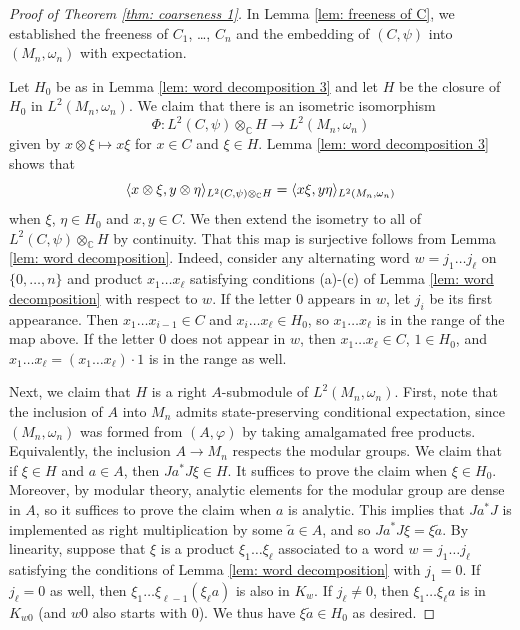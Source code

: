 \documentclass[10pt]{amsart}
\numberwithin{equation}{section}
\theoremstyle{definition}
\newcommand{\C}{\mathbb{C}}
\DeclarePairedDelimiter{\ip}{\langle}{\rangle}
\begin{document}
\begin{proof}[Proof of Theorem \ref{thm: coarseness 1}]
In Lemma \ref{lem: freeness of C}, we established the freeness of $C_1$, \dots, $C_n$ and the embedding of $(C,\psi)$ into $(M_n,\omega_n)$ with expectation.

Let $H_0$ be as in Lemma \ref{lem: word decomposition 3} and let $H$ be the closure of $H_0$ in $L^2(M_n,\omega_n)$.  We claim that there is an isometric isomorphism
\begin{equation} \label{eq: constructing isometry}
	\Phi: L^2(C,\psi) \otimes_{\C} H \to L^2(M_n,\omega_n)
\end{equation}
given by $x \otimes \xi \mapsto x \xi$ for $x \in C$ and $\xi \in H$.  Lemma \ref{lem: word decomposition 3} shows that
\[
\ip{x \otimes \xi, y \otimes \eta}_{L^2(C,\psi) \otimes_{\C} H} = \ip{x\xi, y \eta}_{L^2(M_n,\omega_n)}
\]
when $\xi$, $\eta \in H_0$ and $x, y \in C$.  We then extend the isometry to all of $L^2(C,\psi) \otimes_{\C} H$ by continuity. That this map is surjective follows from Lemma \ref{lem: word decomposition}. Indeed, consider any alternating word $w = j_1\dots j_\ell$ on $\{0,\dots,n\}$ and product $x_1\dots x_\ell$ satisfying conditions (a)-(c) of Lemma \ref{lem: word decomposition} with respect to $w$. If the letter 0 appears in $w$, let $j_i$ be its first appearance. Then $x_1\dots x_{i-1} \in C$ and $x_i\dots x_\ell \in H_0$, so $x_1\dots x_\ell$ is in the range of the map above. If the letter 0 does not appear in $w$, then $x_1\dots x_\ell \in C$, $1 \in H_0$, and $x_1\dots x_\ell = (x_1\dots x_\ell) \cdot 1$ is in the range as well.

Next, we claim that $H$ is a right $A$-submodule of $L^2(M_n,\omega_n)$.  First, note that the inclusion of $A$ into $M_n$ admits state-preserving conditional expectation, since $(M_n,\omega_n)$ was formed from $(A,\varphi)$ by taking amalgamated free products.  Equivalently, the inclusion $A \to M_n$ respects the modular groups.  We claim that if $\xi \in H$ and $a \in A$, then $Ja^*J \xi \in H$.  It suffices to prove the claim when $\xi \in H_0$.  Moreover, by modular theory, analytic elements for the modular group are dense in $A$, so it suffices to prove the claim when $a$ is analytic.  This implies that $J a^* J$ is implemented as right multiplication by some $\tilde{a} \in A$, and so $Ja^*J \xi = \xi \tilde{a}$.  By linearity, suppose that $\xi$ is a product $\xi_1 \dots \xi_\ell$ associated to a word $w = j_1 \dots j_\ell$ satisfying the conditions of Lemma \ref{lem: word decomposition} with $j_1 = 0$.  If $j_\ell = 0$ as well, then $\xi_1 \dots \xi_{\ell-1} (\xi_\ell a)$ is also in $K_w$.  If $j_\ell \neq 0$, then $\xi_1 \dots \xi_\ell a$ is in $K_{w0}$ (and $w0$ also starts with $0$).  We thus have $\xi \tilde{a} \in H_0$ as desired.


\end{proof}
\end{document}
